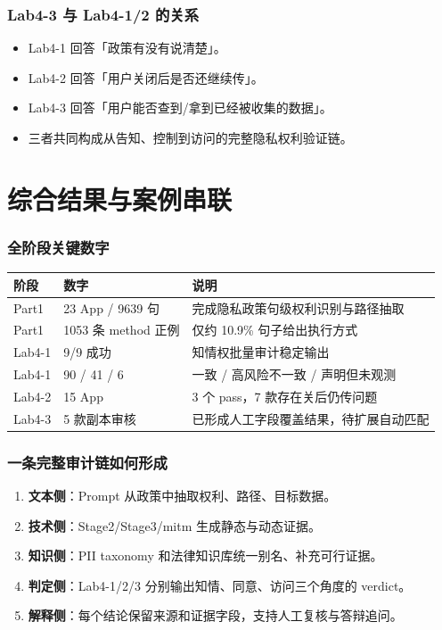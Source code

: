 \documentclass[AutoFakeBold,AutoFakeSlant]{beamer}
\begin{document}
\begin{frame}
    \frametitle{Lab4-3 与 Lab4-1/2 的关系}
    \small
    \begin{itemize}
        \item Lab4-1 回答「政策有没有说清楚」。
        \item Lab4-2 回答「用户关闭后是否还继续传」。
        \item Lab4-3 回答「用户能否查到/拿到已经被收集的数据」。
        \item 三者共同构成从告知、控制到访问的完整隐私权利验证链。
    \end{itemize}
\end{frame}

\section{综合结果与案例串联}

\begin{frame}
    \frametitle{全阶段关键数字}
    \small
    \begin{tabularx}{\textwidth}{|l|l|X|}
        \hline
        \textbf{阶段} & \textbf{数字} & \textbf{说明} \\
        \hline
        Part1 & 23 App / 9639 句 & 完成隐私政策句级权利识别与路径抽取 \\
        \hline
        Part1 & 1053 条 method 正例 & 仅约 10.9\% 句子给出执行方式 \\
        \hline
        Lab4-1 & 9/9 成功 & 知情权批量审计稳定输出 \\
        \hline
        Lab4-1 & 90 / 41 / 6 & 一致 / 高风险不一致 / 声明但未观测 \\
        \hline
        Lab4-2 & 15 App & 3 个 pass，7 款存在关后仍传问题 \\
        \hline
        Lab4-3 & 5 款副本审核 & 已形成人工字段覆盖结果，待扩展自动匹配 \\
        \hline
    \end{tabularx}
\end{frame}

\begin{frame}
    \frametitle{一条完整审计链如何形成}
    \small
    \begin{enumerate}
        \item \textbf{文本侧}：Prompt 从政策中抽取权利、路径、目标数据。
        \item \textbf{技术侧}：Stage2/Stage3/mitm 生成静态与动态证据。
        \item \textbf{知识侧}：PII taxonomy 和法律知识库统一别名、补充可行证据。
        \item \textbf{判定侧}：Lab4-1/2/3 分别输出知情、同意、访问三个角度的 verdict。
        \item \textbf{解释侧}：每个结论保留来源和证据字段，支持人工复核与答辩追问。
    \end{enumerate}
\end{frame}
\end{document}
